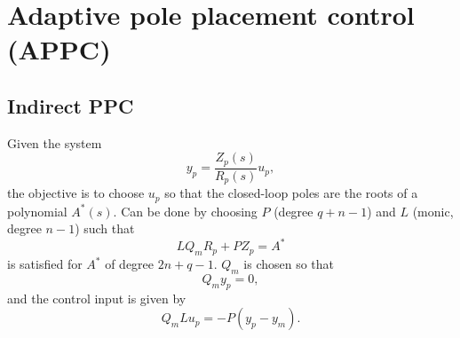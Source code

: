 \section{Adaptive pole placement control (APPC)}

\subsection{Indirect PPC}
Given the system
\begin{equation}
	y_p = \frac{Z_p(s)}{R_p(s)} u_p
	,
\end{equation}
the objective is to choose $u_p$ so that the closed-loop poles are the roots of a polynomial $A^*(s)$. Can be done by choosing $P$ (degree $q+n-1$) and $L$ (monic, degree $n-1$) such that
\begin{equation}
	L Q_m R_p + P Z_p = A^*
\end{equation}
is satisfied for $A^*$ of degree $2n+q-1$. $Q_m$ is chosen so that
\begin{equation}
	Q_m y_p = 0,
\end{equation}
and the control input is given by
\begin{equation}
	Q_m L u_p = -P (y_p - y_m)
	.
\end{equation}